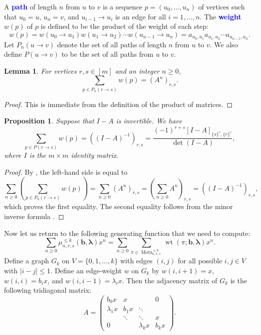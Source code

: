 \documentclass[oneside]{book}
\numberwithin{equation}{section}
\newtheorem{lem}[thm]{Lemma}
\newtheorem{prop}[thm]{Proposition}
\theoremstyle{definition}
\newcommand\Motz{\operatorname{Motz}}
\newcommand\wt{\operatorname{wt}}
\renewcommand\vec[1]{\bm{#1}}
\newcommand\vb{\vec{b}}
\newcommand\vla{\vec{\lambda}}
\renewcommand\emph[1]{\textcolor{blue}{\bf #1}}
\begin{document}
A \emph{path} of length \( n \) from \( u \) to \( v \) is a sequence
\( p= (u_0,\dots,u_n) \) of vertices such that \( u_0=u \),
\( u_n = v \), and \( u_{i-1}\to u_{i} \) is an edge for all
\( i=1,\dots,n \). The \emph{weight} \( w(p) \) of \( p \) is defined
to be the product of the weight of each step:
\[
  w(p) = w(u_0\to u_1) w(u_1\to u_2) \cdots w(u_{n-1}\to u_n)
  = a_{u_0,u_1} a_{u_1,u_2} \cdots a_{u_{n-1},u_n}.
\]
Let \( P_n(u\to v) \) denote the set of all paths of length \( n \)
from \( u \) to \( v \). We also define \( P(u\to v) \) to be the set
of all paths from \( u \) to \( v \).

\begin{lem}\label{lem:8}
  For vertices \( r,s\in [m] \) and an integer \( n\ge0 \),
  \[
    \sum_{p\in P_n(r\to s)} w(p) = (A^n)_{r,s}.
  \]
\end{lem}

\begin{proof}
  This is immediate from the definition of the product of matrices.
\end{proof}

\begin{prop}\label{pro:2}
  Suppose that \( I-A \) is invertible. We have
\[
  \sum_{p\in P(r\to s)}  w(p) = \left( (I-A)^{-1} \right)_{r,s}
    = \frac{(-1)^{r+s} [I-A]_{\{s\}^c,\{r\}^c}}{\det(I-A)},
\]
where \( I \) is the \( m\times m \) identity matrix.
\end{prop}

\begin{proof}
  By , the left-hand side is
  equal to
  \[
    \sum_{n\ge0} \left( \sum_{p\in P_n(r\to s)} w(p) \right) =
    \sum_{n\ge0} (A^n)_{r,s} = \left( \sum_{n\ge0} A^n
    \right)_{r,s} = \left( (I- A)^{-1} \right)_{r,s} ,
\]
which proves the first equality. The second equality follows from the
minor inverse formula .
\end{proof}

Now let us return to the following generating function that we need to
compute:
\begin{equation}\label{eq:59}
  \sum_{n\ge0} \mu_{n,r,s}^{\le k}(\vb,\vla)x^n = \sum_{n\ge0} 
    \sum_{\pi\in \Motz^{\le k}_{n,r,s}} \wt(\pi; \vb,\vla)  x^n.
\end{equation}
Define a graph \( G_k \) on \( V=\{0,1,\dots,k\} \) with edges
\( (i,j) \) for all possible \( i,j\in V \) with \( |i-j|\le 1 \).
Define an edge-weight \( w \) on \( G_k \) by \( w(i,i+1)=x \),
\( w(i,i)=b_ix \), and \( w(i,i-1)=\lambda_ix \). Then the adjacency
matrix of \( G_k \) is the following tridiagonal matrix:
\[
  A = 
  \begin{pmatrix}
    b_0x & x &  & 0 \\
    \lambda_1x & b_1x & \ddots & \\
             & \ddots & \ddots & x \\
   0  &  & \lambda_{k}x & b_{k}x
  \end{pmatrix}.
\]
\end{document}
